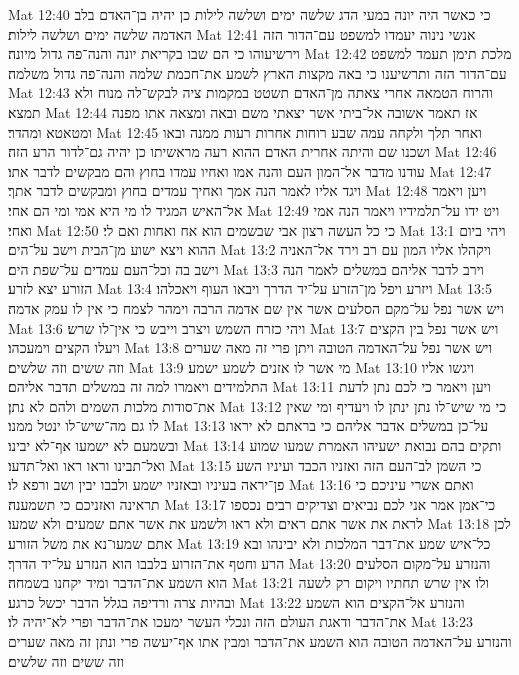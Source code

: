 Mat 12:40  כי כאשר היה יונה במעי הדג שלשה ימים ושלשה לילות כן יהיה בן־האדם בלב האדמה שלשה ימים ושלשה לילות׃
Mat 12:41  אנשי נינוה יעמדו למשפט עם־הדור הזה וירשיעוהו כי הם שבו בקריאת יונה והנה־פה גדול מיונה׃
Mat 12:42  מלכת תימן תעמד למשפט עם־הדור הזה ותרשיענו כי באה מקצות הארץ לשמע את־חכמת שלמה והנה־פה גדול משלמה׃
Mat 12:43  והרוח הטמאה אחרי צאתה מן־האדם תשטט במקמות ציה לבקש־לה מנוח ולא תמצא׃
Mat 12:44  אז תאמר אשובה אל־ביתי אשר יצאתי משם ובאה ומצאה אתו מפנה ומטאטא ומהדר׃
Mat 12:45  ואחר תלך ולקחה עמה שבע רוחות אחרות רעות ממנה ובאו ושכנו שם והיתה אחרית האדם ההוא רעה מראשיתו כן יהיה גם־לדור הרע הזה׃
Mat 12:46  עודנו מדבר אל־המון העם והנה אמו ואחיו עמדו בחוץ והם מבקשים לדבר אתו׃
Mat 12:47  ויגד אליו לאמר הנה אמך ואחיך עמדים בחוץ ומבקשים לדבר אתך׃
Mat 12:48  ויען ויאמר אל־האיש המגיד לו מי היא אמי ומי הם אחי׃
Mat 12:49  ויט ידו על־תלמידיו ויאמר הנה אמי ואחי׃
Mat 12:50  כי כל העשה רצון אבי שבשמים הוא אח ואחות ואם לי׃
Mat 13:1  ויהי ביום ההוא ויצא ישוע מן־הבית וישב על־הים׃
Mat 13:2  ויקהלו אליו המון עם רב וירד אל־האניה וישב בה וכל־העם עמדים על־שפת הים׃
Mat 13:3  וירב לדבר אליהם במשלים לאמר הנה הזורע יצא לזרע׃
Mat 13:4  ויזרע ויפל מן־הזרע על־יד הדרך ויבאו העוף ויאכלהו׃
Mat 13:5  ויש אשר נפל על־מקם הסלעים אשר אין שם אדמה הרבה וימהר לצמח כי אין לו עמק אדמה׃
Mat 13:6  ויהי כזרח השמש ויצרב וייבש כי אין־לו שרש׃
Mat 13:7  ויש אשר נפל בין הקצים ויעלו הקצים וימעכהו׃
Mat 13:8  ויש אשר נפל על־האדמה הטובה ויתן פרי זה מאה שערים וזה ששים וזה שלשים׃
Mat 13:9  מי אשר לו אזנים לשמע ישמע׃
Mat 13:10  ויגשו אליו התלמידים ויאמרו למה זה במשלים תדבר אליהם׃
Mat 13:11  ויען ויאמר כי לכם נתן לדעת את־סודות מלכות השמים ולהם לא נתן׃
Mat 13:12  כי מי שיש־לו נתן ינתן לו ויעדיף ומי שאין לו גם מה־שיש־לו ינטל ממנו׃
Mat 13:13  על־כן במשלים אדבר אליהם כי בראתם לא יראו ובשמעם לא ישמעו אף־לא יבינו׃
Mat 13:14  ותקים בהם נבואת ישעיהו האמרת שמעו שמוע ואל־תבינו וראו ראו ואל־תדעו׃
Mat 13:15  כי השמן לב־העם הזה ואזניו הכבד ועיניו השע פן־יראה בעיניו ובאזניו ישמע ולבבו יבין ושב ורפא לו׃
Mat 13:16  ואתם אשרי עיניכם כי תראינה ואזניכם כי תשמענה׃
Mat 13:17  כי־אמן אמר אני לכם נביאים וצדיקים רבים נכספו לראת את אשר אתם ראים ולא ראו ולשמע את אשר אתם שמעים ולא שמעו׃
Mat 13:18  לכן אתם שמעו־נא את משל הזורע׃
Mat 13:19  כל־איש שמע את־דבר המלכות ולא יבינהו ובא הרע וחטף את־הזרוע בלבבו הוא הנזרע על־יד הדרך׃
Mat 13:20  והנזרע על־מקום הסלעים הוא השמע את־הדבר ומיד יקחנו בשמחה׃
Mat 13:21  ולו אין שרש תחתיו ויקום רק לשעה ובהיות צרה ורדיפה בגלל הדבר יכשל כרגע׃
Mat 13:22  והנזרע אל־הקצים הוא השמע את־הדבר ודאגת העולם הזה ונכלי העשר ימעכו את־הדבר ופרי לא־יהיה לו׃
Mat 13:23  והנזרע על־האדמה הטובה הוא השמע את־הדבר ומבין אתו אף־יעשה פרי ונתן זה מאה שערים וזה ששים וזה שלשים׃
